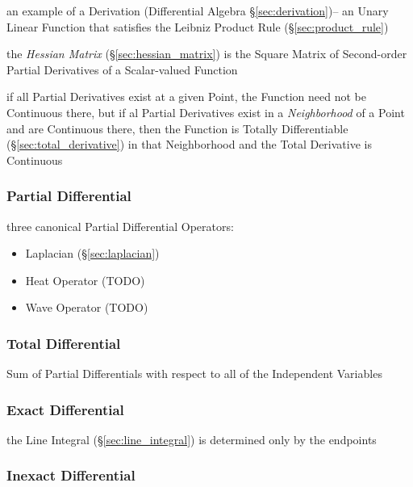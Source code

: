 an example of a Derivation (Differential Algebra \S\ref{sec:derivation})-- an
Unary Linear Function that satisfies the Leibniz Product Rule
(\S\ref{sec:product_rule})

the \emph{Hessian Matrix} (\S\ref{sec:hessian_matrix}) is the Square Matrix of
Second-order Partial Derivatives of a Scalar-valued Function

if all Partial Derivatives exist at a given Point, the Function need not be
Continuous there, but if al Partial Derivatives exist in a \emph{Neighborhood}
of a Point and are Continuous there, then the Function is Totally Differentiable
(\S\ref{sec:total_derivative}) in that Neighborhood and the Total Derivative is
Continuous



\subsubsection{Partial Differential}\label{sec:partial_differential}

three canonical Partial Differential Operators:
\begin{itemize}
  \item Laplacian (\S\ref{sec:laplacian})
  \item Heat Operator (TODO)
  \item Wave Operator (TODO)
\end{itemize}



\subsubsection{Total Differential}\label{sec:total_differential}

Sum of Partial Differentials with respect to all of the Independent
Variables



\subsubsection{Exact Differential}\label{sec:exact_differential}

the Line Integral (\S\ref{sec:line_integral}) is determined only by the
endpoints



\subsubsection{Inexact Differential}\label{sec:inexact_differential}

